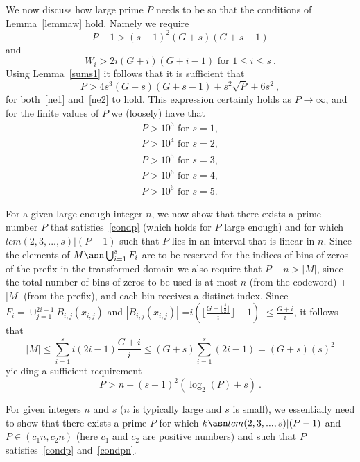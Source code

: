 We now discuss how large prime $P$ needs to be so that the
conditions of Lemma~\ref{lemmaw} hold. Namely we require
\begin{equation}\label{ne1}
P-1> (s-1)^2(G+s)(G+s-1) \end{equation} and
\begin{equation}\label{ne2}W_i>2i(G+i)(G+i-1) \text{ for }1 \leq i \leq s~. \end{equation} Using
Lemma~\ref{sums1} it follows that it is sufficient that
\begin{equation}\label{condp}
P > 4s^3(G+s)(G+s-1)+s^2\sqrt{P}+6s^2~,
\end{equation}
for both~\eqref{ne1} and~\eqref{ne2} to hold. This expression
certainly holds as $P\rightarrow \infty$, and for the finite
values of $P$ we (loosely) have that
\begin{eqnarray*}
P>10^3 \text{ for } s=1, \\P>10^4 \text{ for } s=2, \\P>10^5
\text{ for } s=3,\\ P>10^6 \text{ for } s=4,\\P>10^6 \text{ for }
s=5.
\end{eqnarray*}

 For a given large enough integer $n$, we now show that
there exists a prime number $P$ that satisfies~\eqref{condp}
(which holds for $P$ large enough) and for which $lcm(2,3,...,s) |
(P-1)$ such that $P$ lies in an interval that is linear in $n$.
Since the elements of $M \asn \bigcup_{i=1}^s F_i$ are to be
reserved for the indices of bins of zeros of the prefix in the
transformed domain we also require that $P-n > |M|$, since the
total number of bins of zeros to be used is at most $n$ (from the
codeword) + $|M|$ (from the prefix), and each bin receives a
distinct index. Since $F_i= \cup_{j=1}^{2i-1} B_{i,j}(x_{i,j})$
and $|B_{i,j}(x_{i,j})|$ =$i\left( \lfloor \frac{G-\lfloor
\frac{j}{2}\rfloor}{i}\rfloor+1\right)$ $\leq \frac{G+i}{i}$, it
follows that \begin{equation}\label{eqM} |M| \leq \sum_{i=1}^s
i(2i-1)\frac{G+i}{i} \leq (G+s) \sum_{i=1}^s (2i-1)
=(G+s)(s)^2\end{equation} yielding a sufficient requirement
\begin{equation}\label{condpn}P>n+(s-1)^2(\log_2(P)+s)~.
\end{equation}

For given integers $n$ and $s$ ($n$ is typically large and $s$ is
small), we essentially need to show that there exists a prime $P$
for which $k \asn lcm(2,3,...,s) | (P-1)$ and $P \in (c_1n,c_2n)$
(here $c_1$ and $c_2$ are positive numbers) and such that $P$
satisfies~\eqref{condp} and~\eqref{condpn}.

